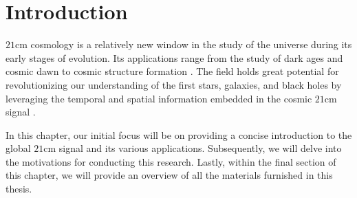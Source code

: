\documentclass[12pt, TexShade, letterpaper]{report}
\begin{document}
	\tableofcontents\thispagestyle{plain}
 \glsunsetall
	\listoffigures\thispagestyle{plain}
 \glsresetall
 \glsunsetall
	\listoftables
  \glsresetall
	\glsaddall
	\setlength\LTleft{0pt}
	\setlength\LTright{0pt}
	\setlength\glsdescwidth{0.8\hsize}
	\printglossary[title={List of Acronyms}]

 	\clearpage
	
	\glsresetall
\chapter{Introduction}
\label{chap:intro}
$\mathrm{21cm}$ cosmology is a relatively new window in the study of the universe during its early stages of evolution. Its applications range from the study of dark ages and cosmic dawn to cosmic structure formation \cite{SKA_dark_ages}. The field holds great potential for revolutionizing our understanding of the first stars, galaxies, and black holes by leveraging the temporal and spatial information embedded in the cosmic $\mathrm{21cm}$ signal \cite{21cmfast_c}.\par

In this chapter, our initial focus will be on providing a concise introduction to the global $\mathrm{21cm}$ signal and its various applications. Subsequently, we will delve into the motivations for conducting this research. Lastly, within the final section of this chapter, we will provide an overview of all the materials furnished in this thesis.\par
\end{document}
